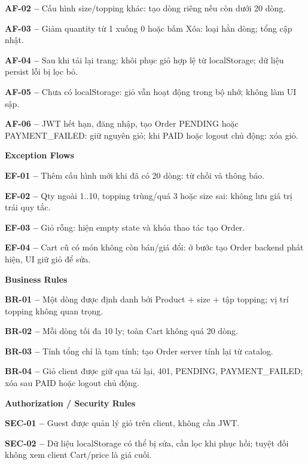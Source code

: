 \documentclass[11pt,a4paper,oneside]{report}
\begin{document}
\textbf{AF-02 --} Cấu hình size/topping khác: tạo dòng riêng nếu còn dưới 20 dòng.

\textbf{AF-03 --} Giảm quantity từ 1 xuống 0 hoặc bấm Xóa: loại hẳn dòng; tổng cập nhật.

\textbf{AF-04 --} Sau khi tải lại trang: khôi phục giỏ hợp lệ từ localStorage; dữ liệu persist lỗi bị lọc bỏ.

\textbf{AF-05 --} Chưa có localStorage: giỏ vẫn hoạt động trong bộ nhớ; không làm UI sập.

\textbf{AF-06 --} JWT hết hạn, đăng nhập, tạo Order PENDING hoặc PAYMENT\_FAILED: giữ nguyên giỏ; khi PAID hoặc logout chủ động: xóa giỏ.
\par

\par\smallskip\noindent\textcolor{sgublue}{\textbf{Exception Flows}}\par\nobreak
\textbf{EF-01 --} Thêm cấu hình mới khi đã có 20 dòng: từ chối và thông báo.

\textbf{EF-02 --} Qty ngoài 1..10, topping trùng/quá 3 hoặc size sai: không lưu giá trị trái quy tắc.

\textbf{EF-03 --} Giỏ rỗng: hiện empty state và khóa thao tác tạo Order.

\textbf{EF-04 --} Cart cũ có món không còn bán/giá đổi: ở bước tạo Order backend phát hiện, UI giữ giỏ để sửa.
\par

\par\smallskip\noindent\textcolor{sgublue}{\textbf{Business Rules}}\par\nobreak
\textbf{BR-01 --} Một dòng được định danh bởi Product + size + tập topping; vị trí topping không quan trọng.

\textbf{BR-02 --} Mỗi dòng tối đa 10 ly; toàn Cart không quá 20 dòng.

\textbf{BR-03 --} Tính tổng chỉ là tạm tính; tạo Order server tính lại từ catalog.

\textbf{BR-04 --} Giỏ client được giữ qua tải lại, 401, PENDING, PAYMENT\_FAILED; xóa sau PAID hoặc logout chủ động.
\par

\par\smallskip\noindent\textcolor{sgublue}{\textbf{Authorization / Security Rules}}\par\nobreak
\textbf{SEC-01 --} Guest được quản lý giỏ trên client, không cần JWT.

\textbf{SEC-02 --} Dữ liệu localStorage có thể bị sửa, cần lọc khi phục hồi; tuyệt đối không xem client Cart/price là giá cuối.
\par
\end{document}
